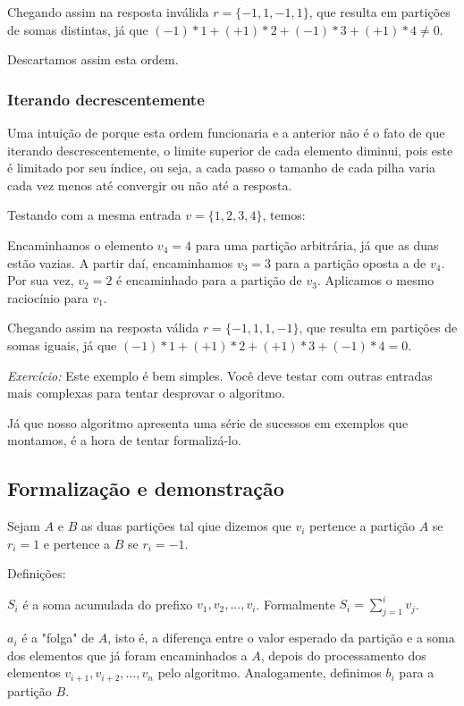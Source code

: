 Chegando assim na resposta inválida $r = \{-1, 1, -1, 1\}$, que resulta em partições de somas distintas, já que $(-1)*1 + (+1)*2 + (-1)*3 + (+1)*4 \neq 0$.

Descartamos assim esta ordem.

\subsubsection*{Iterando decrescentemente}

Uma intuição de porque esta ordem funcionaria e a anterior não é o fato de que iterando descrescentemente, o limite superior de cada elemento diminui, pois este é limitado por seu índice, ou seja, a cada passo o tamanho de cada pilha varia cada vez menos até convergir ou não até a resposta.

Testando com a mesma entrada $v = \{1, 2, 3, 4\}$, temos:

Encaminhamos o elemento $v_4 = 4$ para uma partição arbitrária, já que as duas estão vazias. A partir daí, encaminhamos $v_3 = 3$ para a partição oposta a de $v_4$. Por sua vez, $v_2 = 2$ é encaminhado para a partição de $v_3$. Aplicamos o mesmo raciocínio para $v_1$.

Chegando assim na resposta válida $r = \{-1, 1, 1, -1\}$, que resulta em partições de somas iguais, já que $(-1)*1 + (+1)*2 + (+1)*3 + (-1)*4 = 0$.

\emph{Exercício:} Este exemplo é bem simples. Você deve testar com outras entradas mais complexas para tentar desprovar o algoritmo.

Já que nosso algoritmo apresenta uma série de sucessos em exemplos que montamos, é a hora de tentar formalizá-lo.



\subsection*{Formalização e demonstração}

Sejam $A$ e $B$ as duas partições tal qiue dizemos que $v_i$ pertence a partição $A$ se $r_i = 1$ e pertence a $B$ se $r_i = -1$.

Definições:

$S_i$ é a soma acumulada do prefixo $v_1, v_2, ..., v_i$. Formalmente $S_i = \sum_{j = 1}^{i} v_j$.

$a_i$ é a "folga" de $A$, isto é, a diferença entre o valor esperado da partição e a soma dos elementos que já foram encaminhados a $A$, depois do processamento dos elementos $v_{i + 1}, v_{i + 2}, ..., v_{n}$ pelo algoritmo.
Analogamente, definimos $b_i$ para a partição $B$.


